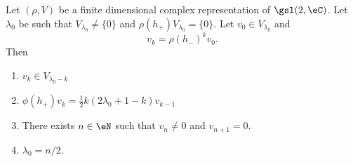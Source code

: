 \begin{proposition}[\label{BIBooUXTFooXTeMOn}]      \label{PROPooZCAOooHHGxQk}
    Let \( (\rho, V)\) be a finite dimensional complex representation of \( \gsl(2,\eC)\). Let \( \lambda_0\) be such that \( V_{\lambda_0}\neq \{ 0 \}\) and \( \rho(h_+)V_{\lambda_0}=\{ 0 \}\). Let \( v_0\in V_{\lambda_0}\) and 
    \begin{equation}
        v_k=\rho(h_-)^kv_0.
    \end{equation}
    Then
    \begin{enumerate}
        \item       \label{ITEMooBPPFooKdGyqO}
            \( v_k\in V_{\lambda_0-k}\)
        \item       \label{ITEMooHNULooHoTgEa}
                    \( \phi(h_+)v_k=\frac{ 1 }{2}k(2\lambda_0+1-k)v_{k-1}\)
                \item       \label{ITEMooHDAPooClASpy}
                    There exists \( n\in \eN\) such that \( v_n\neq 0\) and \( v_{n+1}=0\).
                \item       \label{ITEMooJBZFooGqallS}
                    \( \lambda_0=n/2\).
    \end{enumerate}
\end{proposition}

